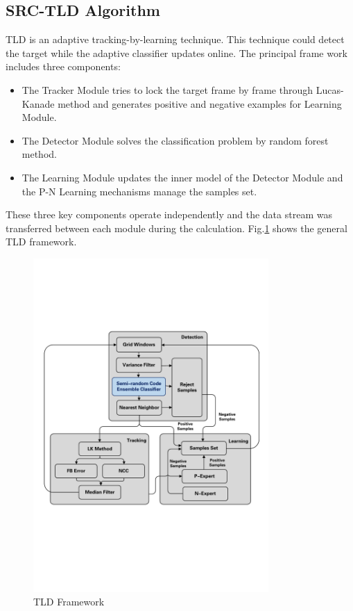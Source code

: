 \subsection{SRC-TLD Algorithm}
TLD\cite{kalal2012tracking}\cite{kong2015ground} is an adaptive tracking-by-learning technique. This technique could detect the target while the adaptive classifier updates online. The principal frame work includes three components: 
\begin{itemize}
	\item The Tracker Module tries to lock the target frame by frame through Lucas-Kanade method and generates positive and negative examples for Learning Module.
	
	\item The Detector Module solves the classification problem by random forest method.
		
	\item The Learning Module updates the inner model of the Detector Module and the P-N Learning mechanisms manage the samples set.
\end{itemize}
These three key components operate independently and the data stream was transferred between each module during the calculation. Fig.\ref{fig:sci03_tld_framework} shows the general TLD framework.

\begin{figure}[!th]
	\centering
	\includegraphics[width=0.8\textwidth]{Figs/sci03_tld_framework.pdf}	
	\caption{TLD Framework}
	\label{fig:sci03_tld_framework}
\end{figure}

